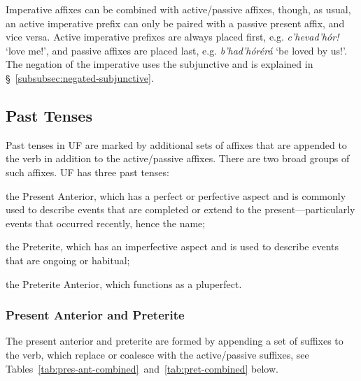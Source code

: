 \documentclass[a4paper, 12pt, twoside, final]{article}
\let \w \textit
\begin{document}
Imperative affixes can be combined with active/passive affixes, though, as usual, an active imperative prefix
can only be paired with a passive present affix, and vice versa. Active imperative prefixes are always placed
first, e.g. \w{c’hevad’hór!} ‘love me!’, and passive affixes are placed last, e.g. \w{b’had’hórérá} ‘be loved by
us!’. The negation of the imperative uses the subjunctive and is explained in §~\ref{subsubsec:negated-subjunctive}.

\subsection{Past Tenses}\label{subsec:tense-and-aspect-marking}
Past tenses in UF are marked by additional sets of affixes that are appended to the verb in addition to the active/passive affixes.
There are two broad groups of such affixes. UF has three past tenses:
\begin{items}
\item the Present Anterior, which has a perfect or perfective aspect and is commonly used
      to describe events that are completed or extend to the present—particularly events that occurred recently, hence the name;
\item the Preterite, which has an imperfective aspect and is used to describe events that are ongoing or habitual;
\item the Preterite Anterior, which functions as a pluperfect.
\end{items}

\subsubsection{Present Anterior and Preterite}\label{subsubsec:suffixed-tenses}
The present anterior and preterite are formed by appending a set of suffixes to the verb, which replace or coalesce with the active/passive
suffixes, see Tables~\ref{tab:pres-ant-combined}~and~\ref{tab:pret-combined} below.
\end{document}

